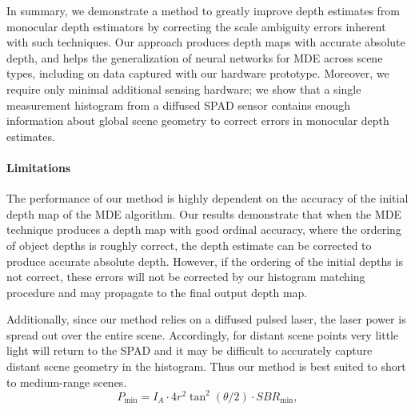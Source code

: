 In summary, we demonstrate a method to greatly improve depth estimates from
monocular depth estimators by correcting the scale ambiguity errors inherent
with such techniques.  Our approach produces depth maps with accurate absolute
depth, and helps the generalization of neural networks for MDE across scene
types, including on data captured with our hardware prototype.  Moreover, we
require only minimal additional sensing hardware; we show that a single measurement
histogram from a diffused SPAD sensor contains enough information about global
scene geometry to correct errors in monocular depth estimates.

\paragraph{Limitations}
The performance of our method is highly dependent on the accuracy of the initial
depth map of the MDE algorithm.
Our results demonstrate that when the MDE technique produces a depth map
with good ordinal accuracy, where the ordering of object depths is roughly correct, the
depth estimate can be corrected to produce accurate absolute depth. However, if
the ordering of the initial depths is not correct, these errors will not be
corrected by our histogram matching procedure and may propagate to the final
output depth map.

Additionally, since our method relies on a diffused pulsed laser, the laser
power is spread out over the entire scene. Accordingly, for distant scene points very
little light will return to the SPAD and it may be difficult to accurately
capture distant scene geometry in the histogram. Thus our method is best suited
to short to medium-range scenes. 
\begin{equation}
  P_{\text{min}} = I_A \cdot 4 r^2 \tan^2(\theta/2) \cdot SBR_{\text{min}},
\end{equation} 


